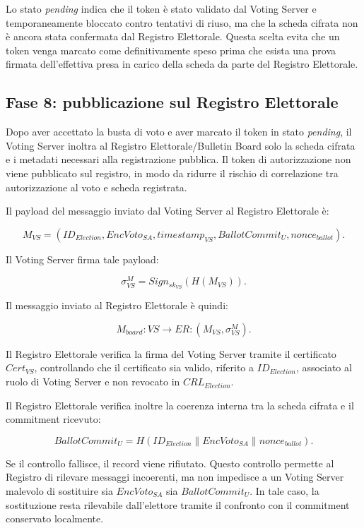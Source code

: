 \documentclass[a4paper,12pt]{article}
\begin{document}
Lo stato \emph{pending} indica che il token \`e stato validato dal Voting Server e temporaneamente bloccato contro tentativi di riuso, ma che la scheda cifrata non \`e ancora stata confermata dal Registro Elettorale.
 Questa scelta evita che un token venga marcato come definitivamente speso prima che esista una prova firmata dell'effettiva presa in carico della scheda da parte del Registro Elettorale.


\subsection{Fase 8: pubblicazione sul Registro Elettorale}

Dopo aver accettato la busta di voto e aver marcato il token in stato \emph{pending}, il Voting Server inoltra al Registro Elettorale/Bulletin Board solo la scheda cifrata e i metadati necessari alla registrazione pubblica.
Il token di autorizzazione non viene pubblicato sul registro, in modo da ridurre il rischio di correlazione tra autorizzazione al voto e scheda registrata.

Il payload del messaggio inviato dal Voting Server al Registro Elettorale \`e:

\[
	M_{VS} =
	(ID_{Election}, EncVoto_{SA}, timestamp_{VS}, BallotCommit_U, nonce_{ballot}).
\]

Il Voting Server firma tale payload:

\[
	\sigma_{VS}^{M} =
	Sign_{sk_{VS}}(H(M_{VS})).
\]

Il messaggio inviato al Registro Elettorale \`e quindi:

\[
	M_{board} : VS \rightarrow ER :
	(M_{VS}, \sigma_{VS}^{M}).
\]

Il Registro Elettorale verifica la firma del Voting Server tramite il certificato \(Cert_{VS}\), controllando che il certificato sia valido, riferito a \(ID_{Election}\), associato al ruolo di Voting Server e non revocato in \(CRL_{Election}\).

Il Registro Elettorale verifica inoltre la coerenza interna tra la scheda cifrata e il commitment ricevuto:

\[
	BallotCommit_U =
	H(ID_{Election} \parallel EncVoto_{SA} \parallel nonce_{ballot}).
\]

Se il controllo fallisce, il record viene rifiutato.
Questo controllo permette al Registro di rilevare messaggi incoerenti, ma non impedisce a un Voting Server malevolo di sostituire sia \(EncVoto_{SA}\) sia \(BallotCommit_U\).
In tale caso, la sostituzione resta rilevabile dall'elettore tramite il confronto con il commitment conservato localmente.
\end{document}
